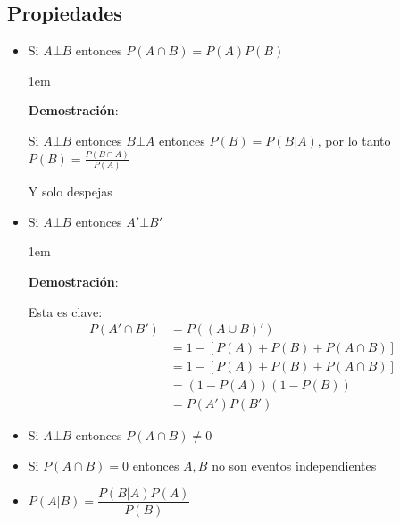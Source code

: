 \documentclass[12pt, fleqn]{report}                             %
\newenvironment{SmallIndentation}[1][0.75em]                    %
        {\begin{adjustwidth}{#1}{}\begin{footnotesize}}             %
        {\end{footnotesize}\end{adjustwidth}}                       %
\theoremstyle{break}                                            %
\begin{document}
            \subsection{Propiedades}

                \begin{itemize}
                   
                    \item
                        Si $A \bot B$ entonces $P(A \cap B) = P(A) P(B)$
                        \begin{SmallIndentation}[1em]
                            \textbf{Demostración}:
                            
                            Si $A \bot B$ entonces $B \bot A$ entonces $P(B) = P(B | A)$, por lo tanto
                            $P(B) = \frac{P(B \cap A)}{P(A)}$

                            Y solo despejas
                        
                        \end{SmallIndentation}

                    \item
                        Si $A \bot B$ entonces $A' \bot B'$

                        \begin{SmallIndentation}[1em]
                            \textbf{Demostración}:

                            Esta es clave:
                            \begin{align*}
                                P(A' \cap B')
                                    &= P((A \cup B)')                       \\
                                    &= 1 - [P(A)  + P(B) + P(A \cap B)]     \\
                                    &= 1 - [P(A)  + P(B) + P(A \cap B)]     \\
                                    &= (1-P(A))(1-P(B))                     \\
                                    &= P(A') P(B')
                            \end{align*}
                        
                        \end{SmallIndentation}

                    \item
                        Si $A \bot B$ entonces $P(A \cap B) \neq 0$

                    \item
                        Si $P(A \cap B) = 0$ entonces $A, B$ no son eventos independientes

                    \item
                        $P(A | B) = \dfrac{P(B|A)P(A)}{P(B)}$

                            
                            
                \end{itemize}
\end{document}
